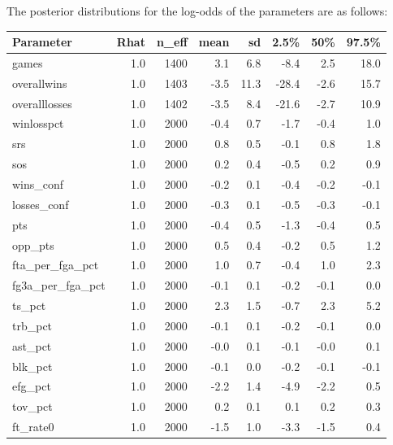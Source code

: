\documentclass[10pt,a4paper, hidelinks]{article} %
\begin{document}
The posterior distributions for the log-odds of the parameters are as follows:

\begin{table}[ht]
	\centering
	\begin{tabular}{lrrrrrrr}
		\toprule
		Parameter & Rhat & n\_eff & mean & sd & 2.5\% & 50\% & 97.5\% \\ 
		\midrule
		games & 1.0 & 1400 & 3.1 & 6.8 & -8.4 & 2.5 & 18.0 \\ 
		overallwins & 1.0 & 1403 & -3.5 & 11.3 & -28.4 & -2.6 & 15.7 \\ 
		overalllosses & 1.0 & 1402 & -3.5 & 8.4 & -21.6 & -2.7 & 10.9 \\ 
		winlosspct & 1.0 & 2000 & -0.4 & 0.7 & -1.7 & -0.4 & 1.0 \\ 
		srs & 1.0 & 2000 & 0.8 & 0.5 & -0.1 & 0.8 & 1.8 \\ 
		sos & 1.0 & 2000 & 0.2 & 0.4 & -0.5 & 0.2 & 0.9 \\ 
		wins\_conf & 1.0 & 2000 & -0.2 & 0.1 & -0.4 & -0.2 & -0.1 \\ 
		losses\_conf & 1.0 & 2000 & -0.3 & 0.1 & -0.5 & -0.3 & -0.1 \\ 
		pts & 1.0 & 2000 & -0.4 & 0.5 & -1.3 & -0.4 & 0.5 \\ 
		opp\_pts & 1.0 & 2000 & 0.5 & 0.4 & -0.2 & 0.5 & 1.2 \\ 
		fta\_per\_fga\_pct & 1.0 & 2000 & 1.0 & 0.7 & -0.4 & 1.0 & 2.3 \\ 
		fg3a\_per\_fga\_pct & 1.0 & 2000 & -0.1 & 0.1 & -0.2 & -0.1 & 0.0 \\ 
		ts\_pct & 1.0 & 2000 & 2.3 & 1.5 & -0.7 & 2.3 & 5.2 \\ 
		trb\_pct & 1.0 & 2000 & -0.1 & 0.1 & -0.2 & -0.1 & 0.0 \\ 
		ast\_pct & 1.0 & 2000 & -0.0 & 0.1 & -0.1 & -0.0 & 0.1 \\ 
		blk\_pct & 1.0 & 2000 & -0.1 & 0.0 & -0.2 & -0.1 & -0.1 \\ 
		efg\_pct & 1.0 & 2000 & -2.2 & 1.4 & -4.9 & -2.2 & 0.5 \\ 
		tov\_pct & 1.0 & 2000 & 0.2 & 0.1 & 0.1 & 0.2 & 0.3 \\ 
		ft\_rate0 & 1.0 & 2000 & -1.5 & 1.0 & -3.3 & -1.5 & 0.4 \\ 

\end{tabular}
\end{table}
\end{document}

